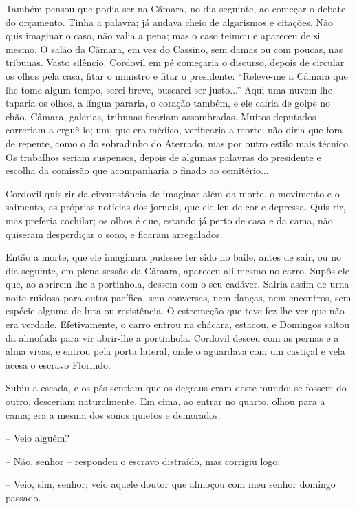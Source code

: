 Também pensou que podia ser na Câmara, no dia seguinte, ao começar o
debate do orçamento. Tinha a palavra; já andava cheio de algarismos e
citações. Não quis imaginar o caso, não valia a pena; mas o caso teimou
e apareceu de si mesmo. O salão da Câmara, em vez do Cassino, sem damas
ou com poucas, nas tribunas. Vasto silêncio. Cordovil em pé começaria o
discurso, depois de circular os olhos pela casa, fitar o ministro e
fitar o presidente: ``Releve-me a Câmara que lhe tome algum tempo, serei
breve, buscarei ser justo...'' Aqui uma nuvem lhe taparia os olhos, a
língua pararia, o coração também, e ele cairia de golpe no chão. Câmara,
galerias, tribunas ficariam assombradas. Muitos deputados correriam a
erguê-lo; um, que era médico, verificaria a morte; não diria que fora de
repente, como o do sobradinho do Aterrado, mas por outro estilo mais
técnico. Os trabalhos seriam suspensos, depois de algumas palavras do
presidente e escolha da comissão que acompanharia o finado ao
cemitério...

Cordovil quis rir da circunstância de imaginar além da morte, o
movimento e o saimento, as próprias notícias dos jornais, que ele leu de
cor e depressa. Quis rir, mas preferia cochilar; os olhos é que, estando
já perto de casa e da cama, não quiseram desperdiçar o sono, e ficaram
arregalados.

Então a morte, que ele imaginara pudesse ter sido no baile, antes de
sair, ou no dia seguinte, em plena sessão da Câmara, apareceu ali mesmo
no carro. Supôs ele que, ao abrirem-lhe a portinhola, dessem com o seu
cadáver. Sairia assim de urna noite ruidosa para outra pacífica, sem
conversas, nem danças, nem encontros, sem espécie alguma de luta ou
resistência. O estremeção que teve fez-lhe ver que não era verdade.
Efetivamente, o carro entrou na chácara, estacou, e Domingos saltou da
almofada para vir abrir-lhe a portinhola. Cordovil desceu com as pernas
e a alma vivas, e entrou pela porta lateral, onde o aguardava com um
castiçal e vela acesa o escravo Florindo.

Subiu a escada, e os pés sentiam que os degraus eram deste mundo; se
fossem do outro, desceriam naturalmente. Em cima, ao entrar no quarto,
olhou para a cama; era a mesma dos sonos quietos e demorados.

-- Veio alguém?

-- Não, senhor -- respondeu o escravo distraído, mas corrigiu logo:

-- Veio, sim, senhor; veio aquele doutor que almoçou com meu senhor
domingo passado.

